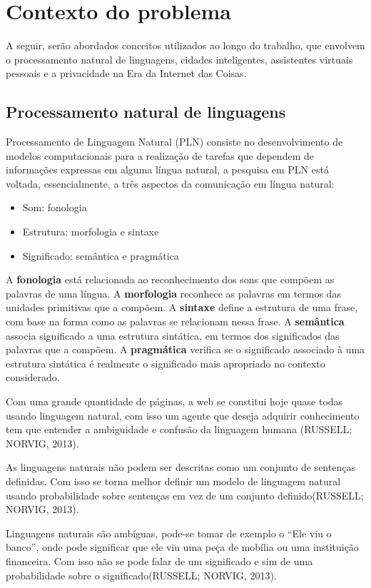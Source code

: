 \chapter{Contexto do problema} \label{c:contexto_do_problema}
A seguir, serão abordados conceitos utilizados ao longo do trabalho, que envolvem o processamento natural de linguagens, cidades inteligentes, assistentes virtuais pessoais e a  privacidade na Era da Internet das Coisas.
\section{Processamento natural de linguagens} \label{s:processamento_natural_de_linguagens}
Processamento de Linguagem Natural (PLN) consiste no desenvolvimento de modelos computacionais para a realização de tarefas que dependem de informações expressas em alguma língua natural, a pesquisa em PLN está voltada, essencialmente, a três aspectos da comunicação em língua natural:
\begin{itemize}
\item  Som: fonologia
\item  Estrutura: morfologia e sintaxe
\item  Significado: semântica e pragmática
\end{itemize}
A \textbf{fonologia} está relacionada ao reconhecimento dos sons que compõem as palavras de uma língua. A \textbf{morfologia} reconhece as palavras em termos das unidades primitivas que a compõem. A \textbf{sintaxe} define a estrutura de uma frase, com base na forma como as palavras se relacionam nessa frase.  A \textbf{semântica} associa significado a uma estrutura sintática, em termos dos significados das palavras que a compõem. A \textbf{pragmática} verifica se o significado associado à uma estrutura sintática é realmente o significado mais apropriado no contexto considerado.

Com uma grande quantidade de páginas, a web se constitui hoje quase todas usando linguagem natural, com isso um agente que deseja adquirir conhecimento tem que entender a ambiguidade e confusão da linguagem humana (RUSSELL; NORVIG, 2013).

As linguagens naturais não podem ser descritas como um conjunto de sentenças definidas. Com isso se torna melhor definir um modelo de linguagem natural usando probabilidade sobre sentenças em vez de um conjunto definido(RUSSELL; NORVIG, 2013).

Linguagens naturais são ambíguas, pode-se tomar de exemplo o “Ele viu o banco”, onde pode significar que ele viu uma peça de mobília ou uma instituição financeira. Com isso não se pode falar de um significado e sim de uma probabilidade sobre o significado(RUSSELL; NORVIG, 2013).

